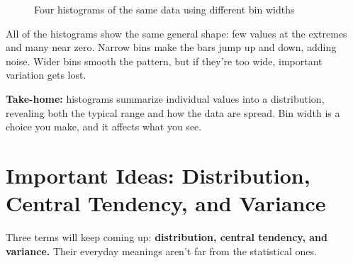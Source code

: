 \documentclass[
  letterpaper,
  DIV=11,
  numbers=noendperiod]{scrreprt}
\begin{document}
\begin{figure}


\caption{\label{fig-manyhistbin}Four histograms of the same data using
different bin widths}

\end{figure}%

All of the histograms show the same general shape: few values at the
extremes and many near zero. Narrow bins make the bars jump up and down,
adding noise. Wider bins smooth the pattern, but if they're too wide,
important variation gets lost.

\textbf{Take-home:} histograms summarize individual values into a
distribution, revealing both the typical range and how the data are
spread. Bin width is a choice you make, and it affects what you see.

\section{Important Ideas: Distribution, Central Tendency, and
Variance}\label{important-ideas-distribution-central-tendency-and-variance}

Three terms will keep coming up: \textbf{distribution, central tendency,
and variance.} Their everyday meanings aren't far from the statistical
ones.
\end{document}

